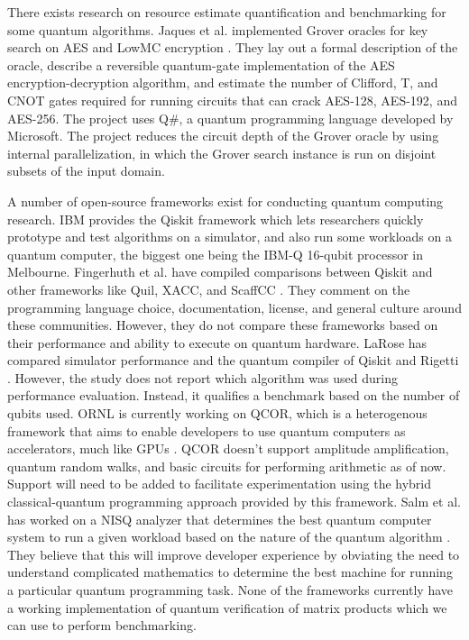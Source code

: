 \documentclass[11pt]{article}
\theoremstyle{definition}
\theoremstyle{remark}
\begin{document}
There exists research on resource estimate quantification and benchmarking for
some quantum algorithms. Jaques et al. implemented Grover oracles for key
search on AES and LowMC encryption \cite{jaques2020implementing}. They lay
out a formal description of the oracle,  describe a reversible quantum-gate
implementation of the AES encryption-decryption algorithm, and estimate the
number of Clifford, T, and CNOT gates required for running circuits that can
crack AES-128, AES-192, and AES-256. The project uses Q\#, a quantum
programming language developed by Microsoft. The project reduces the circuit
depth of the Grover oracle by using internal parallelization, in which the
Grover search instance is run on disjoint subsets of the input domain.

A number of open-source frameworks exist for conducting quantum computing
research. IBM provides the Qiskit framework which lets researchers quickly
prototype and test algorithms on a simulator, and also run some workloads on a
quantum computer, the biggest one being the IBM-Q 16-qubit processor in
Melbourne. Fingerhuth et al. have compiled comparisons between Qiskit and other
frameworks like Quil, XACC, and ScaffCC \cite{fingerhuth2018open}. They
comment on the programming language choice, documentation, license, and general
culture around these communities. However, they do not compare these frameworks
based on their performance and ability to execute on quantum hardware. LaRose
has compared simulator performance and the quantum compiler of Qiskit and
Rigetti \cite{larose2019overview}.  However, the study does not report which
algorithm was used during performance evaluation. Instead, it qualifies a
benchmark based on the number of qubits used. ORNL is currently working on
QCOR, which is a heterogenous framework that aims to enable developers to use
quantum computers as accelerators, much like GPUs \cite{mintz2020qcor}. QCOR
doesn’t support amplitude amplification, quantum random walks, and basic
circuits for performing arithmetic as of now. Support will need to be added to
facilitate experimentation using the hybrid classical-quantum programming
approach provided by this framework. Salm et al. has worked on a NISQ analyzer
that determines the best quantum computer system to run a given workload based
on the nature of the quantum algorithm \cite{dustdar2020nisq}. They believe
that this will improve developer experience by obviating the need to understand
complicated mathematics to determine the best machine for running a particular
quantum programming task. None of the frameworks currently have a working
implementation of quantum verification of matrix products which we can use to
perform benchmarking.
\end{document}
